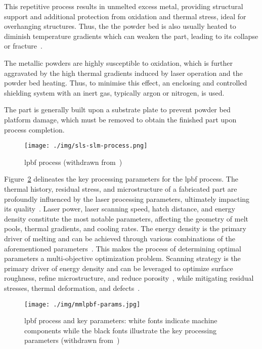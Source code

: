 This repetitive process results in unmelted excess metal, providing structural
support and additional protection from oxidation and thermal
stress, ideal for overhanging structures. Thus, the 
the powder bed is also usually heated to diminish temperature gradients which can weaken the part, leading to its collapse or fracture~\cite{thompson2015overview}.

The metallic powders are highly susceptible to oxidation, which is further
aggravated by the high thermal gradients induced by laser operation and the
powder bed heating. Thus, to minimise this effect, an enclosing and controlled
shielding system with an inert gas, typically argon or nitrogen, is used.

The part is generally built upon a substrate
plate to prevent powder bed platform damage, which must be removed to obtain the
finished part upon process completion.
%
\begin{figure}[!hbtp]
  \centering
 \texttt{[image: ./img/sls-slm-process.png]} 
 \caption[LPBF process]{\gls{lpbf} process (withdrawn from~\cite{thompson2015overview})\footnotemark}%
\label{fig:sls-slm-process}
\end{figure}
%
%

Figure~\ref{fig:lpbf-params} delineates the key processing parameters for the
\gls{lpbf} process. The thermal history, residual
stress, and microstructure of a fabricated part are profoundly influenced by the
laser processing parameters, ultimately impacting its
quality~\cite{pratt2008residual}. Laser power, laser scanning speed, hatch
distance, and energy density constitute the most notable parameters, affecting
the geometry of melt pools, thermal gradients, and cooling rates. The energy
density is the primary driver of melting and can be achieved through various
combinations of the aforementioned parameters~\cite{sing2016selective}. This
makes the process of determining optimal parameters a multi-objective
optimization problem. Scanning strategy is the primary driver of energy density
and can be leveraged to optimize surface roughness, refine microstructure, and
reduce porosity~\cite{yu2019influence,zou2020numerical}, while mitigating
residual stresses, thermal deformation, and
defects~\cite{kruth2004selective,cheng2016stress,wan2018effect}.

%
\begin{figure}[!hbtp]
  \centering
    \texttt{[image: ./img/mmlpbf-params.jpg]}%
    \caption[LPBF process and key parameters]{\gls{lpbf} process and key
      parameters\footnotemark: white fonts indicate machine components while the black fonts
      illustrate the key processing parameters (withdrawn from~\cite{sing2021emerging})}%
    \label{fig:lpbf-params}
\end{figure}
%

